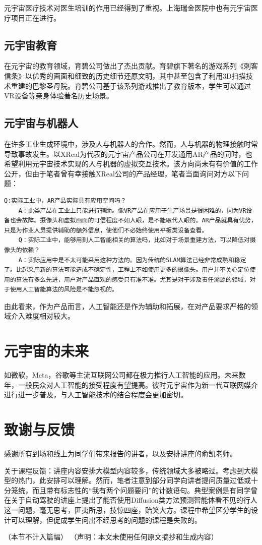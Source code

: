 \documentclass{article}
\begin{document}
	元宇宙医疗技术对医生培训的作用已经得到了重视。上海瑞金医院中也有元宇宙医疗项目正在进行。
	\subsection{元宇宙教育}
	在元宇宙的教育领域，育碧公司做出了杰出贡献。育碧旗下著名的游戏系列《刺客信条》以优秀的画面和细致的历史细节还原文明，其中甚至包含了利用3D扫描技术重建的巴黎圣母院。育碧公司基于该系列游戏推出了教育版本，学生可以通过VR设备等亲身体验著名历史场景\cite{ass}。
	\subsection{元宇宙与机器人}
	在许多工业生成环境中，涉及人与机器人的合作。然而，人与机器的物理接触时常导致事故发生。以XReal为代表的元宇宙产品公司在开发通用AR产品的同时，也希望利用元宇宙技术实现的人与机器的虚拟交互技术。该方向尚未有有价值的工作公开，但由于笔者曾有幸接触XReal公司的产品经理，笔者当面询问对方以下问题：
	
	\begin{lstlisting}[style=json]
	Q:实际工业中，AR产品实际具有应用空间吗？
	A：此类产品在工业上只能进行辅助。像VR产品在应用于生产场景是很困难的，因为VR设备也会故障。摄像头和虚拟画面的可信程度不如人眼，是不能取代人眼的。AR产品就具有优势，只是为作业人员提供辅助的额外信息，使他们不必始终使用平板类设备查看。
	Q：实际工业中，能够用到人工智能相关的算法吗，比如对于场景重建方法，可以降低对摄像头的依赖？
	A：实际应用中是不太可能采用这种方法的。因为传统的SLAM算法已经非常成熟和稳定了。比起采用新的算法可能造成不确定性，工程上不如使用更多的摄像头。用户并不关心定位使用的算法有多么先进，用户对产品直观的感受只有准不准。尤其是对于涉及责任溯源的领域，对于使用人工智能算法的风险是不能忽视的。
	\end{lstlisting}
	由此看来，作为产品而言，人工智能还是作为辅助和拓展，在对产品要求严格的领域介入难度相对较大。
	\section{元宇宙的未来}
	如微软，Meta，谷歌等主流互联网公司都在极力推行人工智能的应用。未来数年，一般民众对人工智能的接受程度有望提高。彼时元宇宙作为新一代互联网媒介进行进一步普及，与人工智能技术的结合程度会更加密切。
	
	\section{致谢与反馈}
	感谢所有到场和线上为同学们带来报告的讲者，以及安排讲座的俞凯老师。
	
	关于课程反馈：讲座内容安排大模型内容较多，传统领域大多被略过。考虑到大模型的热门，此安排可以理解。然而，笔者注意到部分同学向讲者提问质量过低或十分笼统，而且带有标志性的“我有两个问题要问”的计数语句。典型案例是有同学曾在关于自动驾驶的讲座上提出了能否使用Diffusion类方法预测智能体看不见的行人这一问题，毫无思考，匪夷所思，技惊四座，贻笑大方。课程中希望区分学生的设计可以理解，但促成学生问出不经思考的问题的课程是失败的。
	
	（本节不计入篇幅）
	（声明：本文未使用任何原文摘抄和生成内容）
	
	 
\end{document}
